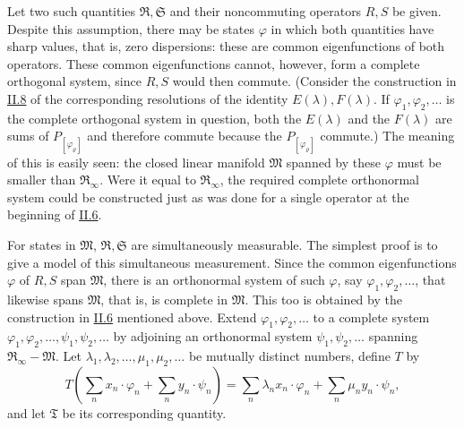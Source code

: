 \documentclass[fontsize=13pt,twoside,openany,headings=normal,parskip=false,bookmarkpackage=false,DIV=calc]{scrbook}
\begin{document}
Let two such quantities $\mathfrak R,\mathfrak S$ and their noncommuting operators $R,S$ be given. Despite this assumption, there may be states $\varphi$ in which both quantities have sharp values, that is, zero dispersions: these are common eigenfunctions of both operators. These common eigenfunctions cannot, however, form a complete orthogonal system, since $R,S$ would then commute. (Consider the construction in \hyperref[sec:II.8]{II.8} of the corresponding resolutions of the identity $E(\lambda),F(\lambda)$. If $\varphi_1,\varphi_2,\ldots$ is the complete orthogonal system in question, both the $E(\lambda)$ and the $F(\lambda)$ are sums of $P_{[\varphi_\varrho]}$ and therefore commute because the $P_{[\varphi_\varrho]}$ commute.) The meaning of this is easily seen: the closed linear manifold $\mathfrak M$ spanned by these $\varphi$ must be smaller than $\mathfrak R_\infty$. Were it equal to $\mathfrak R_\infty$, the required complete orthonormal system could be constructed just as was done for a single operator at the beginning of \hyperref[sec:II.6]{II.6}.

For states in $\mathfrak M$, $\mathfrak R,\mathfrak S$ are simultaneously measurable. The simplest proof is to give a model of this simultaneous
\hypertarget{origpage-122}{}%
measurement. Since the common eigenfunctions $\varphi$ of $R,S$ span $\mathfrak M$, there is an orthonormal system of such $\varphi$, say $\varphi_1,\varphi_2,\ldots$, that likewise spans $\mathfrak M$, that is, is complete in $\mathfrak M$. This too is obtained by the construction in \hyperref[sec:II.6]{II.6} mentioned above. Extend $\varphi_1,\varphi_2,\ldots$ to a complete system $\varphi_1,\varphi_2,\ldots,\psi_1,\psi_2,\ldots$ by adjoining an orthonormal system $\psi_1,\psi_2,\ldots$ spanning $\mathfrak R_\infty-\mathfrak M$. Let $\lambda_1,\lambda_2,\ldots,\mu_1,\mu_2,\ldots$ be mutually distinct numbers, define $T$ by
\[
T\left(\sum_nx_n\cdot\varphi_n+\sum_ny_n\cdot\psi_n\right)
=\sum_n\lambda_nx_n\cdot\varphi_n+\sum_n\mu_ny_n\cdot\psi_n,
\]
and let $\mathfrak T$ be its corresponding quantity.
\end{document}
